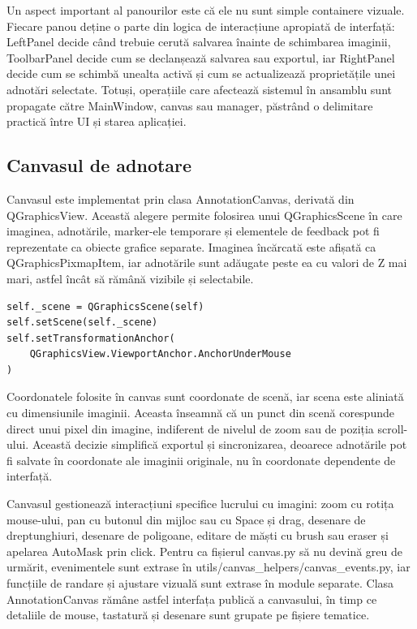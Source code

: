 Un aspect important al panourilor este că ele nu sunt simple containere vizuale. Fiecare panou deține o parte din logica de interacțiune apropiată de interfață: LeftPanel decide când trebuie cerută salvarea înainte de schimbarea imaginii, ToolbarPanel decide cum se declanșează salvarea sau exportul, iar RightPanel decide cum se schimbă unealta activă și cum se actualizează proprietățile unei adnotări selectate. Totuși, operațiile care afectează sistemul în ansamblu sunt propagate către MainWindow, canvas sau manager, păstrând o delimitare practică între UI și starea aplicației.

\subsection{Canvasul de adnotare}

Canvasul este implementat prin clasa AnnotationCanvas, derivată din QGraphicsView. Această alegere permite folosirea unui QGraphicsScene în care imaginea, adnotările, marker-ele temporare și elementele de feedback pot fi reprezentate ca obiecte grafice separate. Imaginea încărcată este afișată ca QGraphicsPixmapItem, iar adnotările sunt adăugate peste ea cu valori de Z mai mari, astfel încât să rămână vizibile și selectabile.

\begin{verbatim}
self._scene = QGraphicsScene(self)
self.setScene(self._scene)
self.setTransformationAnchor(
    QGraphicsView.ViewportAnchor.AnchorUnderMouse
)
\end{verbatim}

Coordonatele folosite în canvas sunt coordonate de scenă, iar scena este aliniată cu dimensiunile imaginii. Aceasta înseamnă că un punct din scenă corespunde direct unui pixel din imagine, indiferent de nivelul de zoom sau de poziția scroll-ului. Această decizie simplifică exportul și sincronizarea, deoarece adnotările pot fi salvate în coordonate ale imaginii originale, nu în coordonate dependente de interfață.

Canvasul gestionează interacțiuni specifice lucrului cu imagini: zoom cu rotița mouse-ului, pan cu butonul din mijloc sau cu Space și drag, desenare de dreptunghiuri, desenare de poligoane, editare de măști cu brush sau eraser și apelarea AutoMask prin click. Pentru ca fișierul canvas.py să nu devină greu de urmărit, evenimentele sunt extrase în utils/canvas\_helpers/canvas\_events.py, iar funcțiile de randare și ajustare vizuală sunt extrase în module separate. Clasa AnnotationCanvas rămâne astfel interfața publică a canvasului, în timp ce detaliile de mouse, tastatură și desenare sunt grupate pe fișiere tematice.

